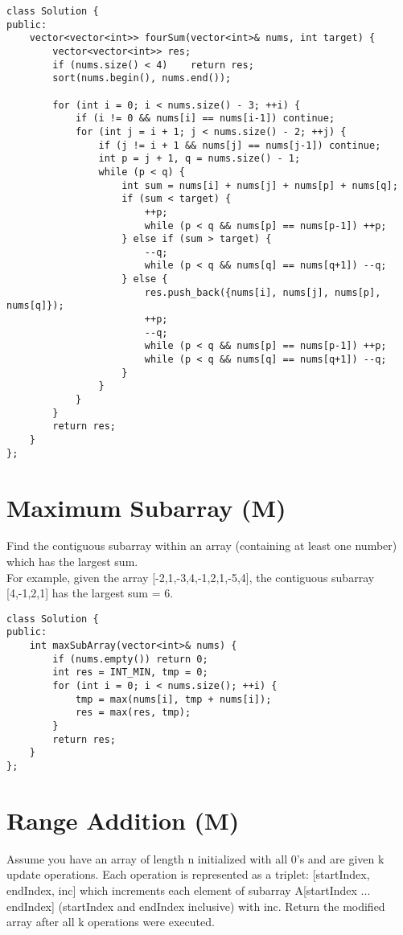 \begin{lstlisting}
class Solution {
public:
    vector<vector<int>> fourSum(vector<int>& nums, int target) {
        vector<vector<int>> res;
        if (nums.size() < 4)    return res;  
        sort(nums.begin(), nums.end());
        
        for (int i = 0; i < nums.size() - 3; ++i) {
            if (i != 0 && nums[i] == nums[i-1]) continue;
            for (int j = i + 1; j < nums.size() - 2; ++j) {
                if (j != i + 1 && nums[j] == nums[j-1]) continue;
                int p = j + 1, q = nums.size() - 1;
                while (p < q) {
                    int sum = nums[i] + nums[j] + nums[p] + nums[q];
                    if (sum < target) {
                        ++p;
                        while (p < q && nums[p] == nums[p-1]) ++p;
                    } else if (sum > target) {
                        --q;
                        while (p < q && nums[q] == nums[q+1]) --q;
                    } else {
                        res.push_back({nums[i], nums[j], nums[p], nums[q]});
                        ++p;
                        --q;
                        while (p < q && nums[p] == nums[p-1]) ++p;
                        while (p < q && nums[q] == nums[q+1]) --q;
                    }
                }
            }
        }
        return res;
    }
};
\end{lstlisting}


\section{Maximum Subarray (M)}
Find the contiguous subarray within an array (containing at least one number) which has the largest sum.\\

For example, given the array [-2,1,-3,4,-1,2,1,-5,4], the contiguous subarray [4,-1,2,1] has the largest sum = 6. \\

\begin{lstlisting}
class Solution {
public:
    int maxSubArray(vector<int>& nums) {
        if (nums.empty()) return 0;
        int res = INT_MIN, tmp = 0;
        for (int i = 0; i < nums.size(); ++i) {
            tmp = max(nums[i], tmp + nums[i]);
            res = max(res, tmp);
        }
        return res;
    }
};
\end{lstlisting}


\section{Range Addition (M)}
Assume you have an array of length n initialized with all 0's and are given k update operations. Each operation is represented as a triplet: [startIndex, endIndex, inc] which increments each element of subarray A[startIndex ... endIndex] (startIndex and endIndex inclusive) with inc. Return the modified array after all k operations were executed.\\

